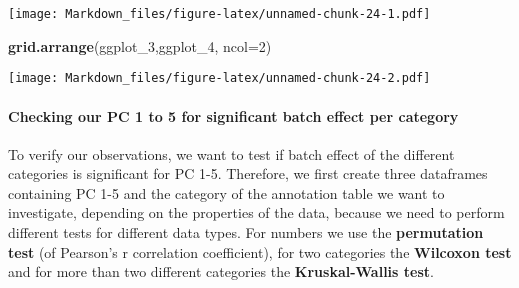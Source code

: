 \documentclass[]{article}
\newenvironment{Shaded}{\begin{snugshade}}{\end{snugshade}}
\newcommand{\KeywordTok}[1]{\textcolor[rgb]{0.13,0.29,0.53}{\textbf{#1}}}
\newcommand{\DataTypeTok}[1]{\textcolor[rgb]{0.13,0.29,0.53}{#1}}
\newcommand{\DecValTok}[1]{\textcolor[rgb]{0.00,0.00,0.81}{#1}}
\newcommand{\StringTok}[1]{\textcolor[rgb]{0.31,0.60,0.02}{#1}}
\newcommand{\OperatorTok}[1]{\textcolor[rgb]{0.81,0.36,0.00}{\textbf{#1}}}
\newcommand{\NormalTok}[1]{#1}
\let\oldparagraph\paragraph
\renewcommand{\paragraph}[1]{\oldparagraph{#1}\mbox{}}
\begin{document}
\texttt{[image: Markdown\_files/figure-latex/unnamed-chunk-24-1.pdf]}

\begin{Shaded}
\begin{Highlighting}[]
\KeywordTok{grid.arrange}\NormalTok{(ggplot_}\DecValTok{3}\NormalTok{,ggplot_}\DecValTok{4}\NormalTok{, }\DataTypeTok{ncol=}\DecValTok{2}\NormalTok{)}
\end{Highlighting}
\end{Shaded}

\texttt{[image: Markdown\_files/figure-latex/unnamed-chunk-24-2.pdf]}

\paragraph{Checking our PC 1 to 5 for significant batch effect per
category}\label{checking-our-pc-1-to-5-for-significant-batch-effect-per-category}

To verify our observations, we want to test if batch effect of the
different categories is significant for PC 1-5. Therefore, we first
create three dataframes containing PC 1-5 and the category of the
annotation table we want to investigate, depending on the properties of
the data, because we need to perform different tests for different data
types. For numbers we use the \textbf{permutation test} (of Pearson's r
correlation coefficient), for two categories the \textbf{Wilcoxon test}
and for more than two different categories the \textbf{Kruskal-Wallis
test}.

\begin{Shaded}
\end{Shaded}
\end{document}
